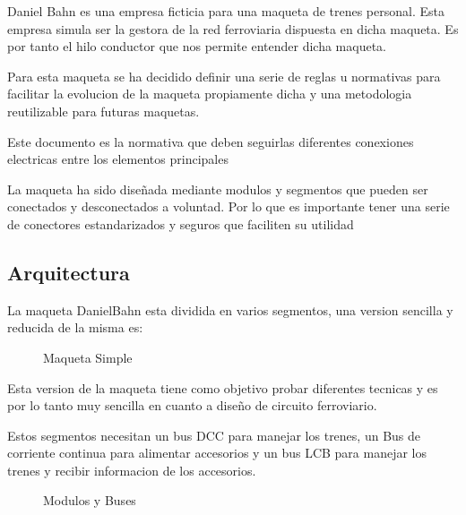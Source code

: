Daniel Bahn es una empresa ficticia para una maqueta de trenes personal. Esta empresa simula ser la gestora de la red ferroviaria dispuesta en dicha maqueta.
Es por tanto el hilo conductor que nos permite entender dicha maqueta.

Para esta maqueta se ha decidido definir una serie de reglas u normativas para facilitar la evolucion de la maqueta propiamente dicha y una metodologia
reutilizable para futuras maquetas.

Este documento es la normativa que deben seguirlas diferentes conexiones electricas entre los elementos principales

La maqueta ha sido diseñada mediante modulos y segmentos que pueden ser conectados y desconectados a voluntad.
Por lo que es importante tener una serie de conectores estandarizados y seguros que faciliten su utilidad

\subsection{Arquitectura}
La maqueta DanielBahn esta dividida en varios segmentos, una version sencilla y reducida
 de la misma es:

\begin{figure}[H]
    \centering
    
    \caption{Maqueta Simple}
    \label{fig:MaquetaSimple}
\end{figure}

Esta version de la maqueta tiene como objetivo probar diferentes tecnicas
y es por lo tanto muy sencilla en cuanto a diseño de circuito ferroviario.

Estos segmentos necesitan un bus DCC para manejar los trenes, un Bus de corriente
continua para alimentar accesorios y un bus LCB para 
manejar los trenes y recibir informacion de los accesorios.

\begin{figure}[H]
    \centering
    
    \caption{Modulos y Buses}
    \label{fig:ModulosBuses}
\end{figure}
